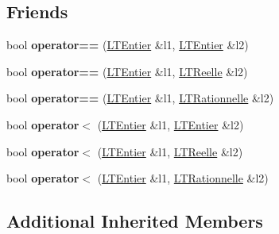 \subsection*{Friends}
\begin{DoxyCompactItemize}
\item 
bool {\bfseries operator==} (\hyperlink{class_l_t_entier}{L\+T\+Entier} \&l1, \hyperlink{class_l_t_entier}{L\+T\+Entier} \&l2)\hypertarget{class_l_t_entier_ad3e747bb85c29afb0bee5df6121b7b0b}{}\label{class_l_t_entier_ad3e747bb85c29afb0bee5df6121b7b0b}

\item 
bool {\bfseries operator==} (\hyperlink{class_l_t_entier}{L\+T\+Entier} \&l1, \hyperlink{class_l_t_reelle}{L\+T\+Reelle} \&l2)\hypertarget{class_l_t_entier_a833d4722d91b3ff8a42c2955622ff4df}{}\label{class_l_t_entier_a833d4722d91b3ff8a42c2955622ff4df}

\item 
bool {\bfseries operator==} (\hyperlink{class_l_t_entier}{L\+T\+Entier} \&l1, \hyperlink{class_l_t_rationnelle}{L\+T\+Rationnelle} \&l2)\hypertarget{class_l_t_entier_a17c0f48909de6fd8d119ed9e756568ed}{}\label{class_l_t_entier_a17c0f48909de6fd8d119ed9e756568ed}

\item 
bool {\bfseries operator$<$} (\hyperlink{class_l_t_entier}{L\+T\+Entier} \&l1, \hyperlink{class_l_t_entier}{L\+T\+Entier} \&l2)\hypertarget{class_l_t_entier_a2e81bf35692e93c53388aa79f173665b}{}\label{class_l_t_entier_a2e81bf35692e93c53388aa79f173665b}

\item 
bool {\bfseries operator$<$} (\hyperlink{class_l_t_entier}{L\+T\+Entier} \&l1, \hyperlink{class_l_t_reelle}{L\+T\+Reelle} \&l2)\hypertarget{class_l_t_entier_af662380021aa46205cf4552096204671}{}\label{class_l_t_entier_af662380021aa46205cf4552096204671}

\item 
bool {\bfseries operator$<$} (\hyperlink{class_l_t_entier}{L\+T\+Entier} \&l1, \hyperlink{class_l_t_rationnelle}{L\+T\+Rationnelle} \&l2)\hypertarget{class_l_t_entier_ae0e9d295db8a3d7e2bed1b8b09b4a596}{}\label{class_l_t_entier_ae0e9d295db8a3d7e2bed1b8b09b4a596}

\end{DoxyCompactItemize}
\subsection*{Additional Inherited Members}


